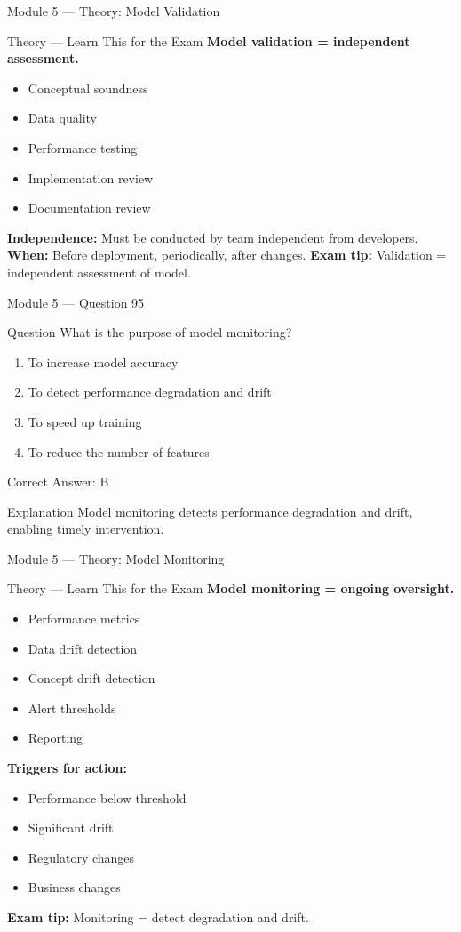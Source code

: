 \documentclass[aspectratio=169,10pt]{beamer}
\newcommand{\question}[1]{%
	\begin{block}{Question}
		#1
	\end{block}
}
\newcommand{\options}[4]{%
	\begin{enumerate}[label=\Alph*.,leftmargin=*]
		\item #1
		\item #2
		\item #3
		\item #4
	\end{enumerate}
}
\newcommand{\answerbox}[1]{%
	\begin{exampleblock}{Correct Answer: #1}
	\end{exampleblock}
}
\newcommand{\explain}[1]{%
	\begin{block}{Explanation}
		\small #1
	\end{block}
}
\newcommand{\theory}[1]{%
	\begin{block}{Theory --- Learn This for the Exam}
		\small #1
	\end{block}
}
\begin{document}
	\begin{frame}{Module 5 --- Theory: Model Validation}
		\theory{
			\textbf{Model validation = independent assessment.}
			\begin{itemize}
				\item Conceptual soundness
				\item Data quality
				\item Performance testing
				\item Implementation review
				\item Documentation review
			\end{itemize}
			\textbf{Independence:} Must be conducted by team independent from developers.
			\textbf{When:} Before deployment, periodically, after changes.
			\textbf{Exam tip:} Validation = independent assessment of model.
		}
	\end{frame}
	
	\begin{frame}{Module 5 --- Question 95}
		\question{What is the purpose of model monitoring?}
		\options{To increase model accuracy}{To detect performance degradation and drift}{To speed up training}{To reduce the number of features}
		\answerbox{B}
		\explain{Model monitoring detects performance degradation and drift, enabling timely intervention.}
	\end{frame}
	
	\begin{frame}{Module 5 --- Theory: Model Monitoring}
		\theory{
			\textbf{Model monitoring = ongoing oversight.}
			\begin{itemize}
				\item Performance metrics
				\item Data drift detection
				\item Concept drift detection
				\item Alert thresholds
				\item Reporting
			\end{itemize}
			\textbf{Triggers for action:}
			\begin{itemize}
				\item Performance below threshold
				\item Significant drift
				\item Regulatory changes
				\item Business changes
			\end{itemize}
			\textbf{Exam tip:} Monitoring = detect degradation and drift.
		}
	\end{frame}
	
\end{document}

